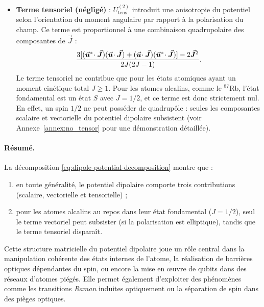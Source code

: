 \begin{itemize}[label = $\bullet$]
  \item[$\times$] \textbf{Terme tensoriel (négligé)} : $U_{\mathrm{tens}}^{(2)}$ introduit une anisotropie du potentiel selon l’orientation du moment angulaire par rapport à la polarisation du champ. Ce terme est proportionnel à une combinaison quadrupolaire des composantes de $\vec{J}$ :
\begin{eqnarray}
	\frac{3[(\vec{{\bm{u}}}^*\!\cdot \vec{{\bm{J}}})(\vec{{\bm{u}}}\!\cdot\vec{{\bm{J}}})+(\vec{{\bm{u}}}\!\cdot\vec{{\bm{J}}})(\vec{{\bm{u}}}^*\!\cdot \vec{{\bm{J}}})]-2\vec{{\bm{J}}}^2}{2J(2J-1)}.	
\end{eqnarray}
Le terme tensoriel ne contribue que pour les états atomiques ayant un moment cinétique total $J \geq 1$. Pour les atomes alcalins, comme le ${}^{87}\mathrm{Rb}$, l’état fondamental est un état $S$ avec $J = 1/2$, et ce terme est donc strictement nul. En effet, un spin $1/2$ ne peut posséder de quadrupôle : seules les composantes scalaire et vectorielle du potentiel dipolaire subsistent (voir Annexe~\ref{annex:no_tensor} pour une démonstration détaillée).




\end{itemize}

\paragraph{Résumé.}  
La décomposition \eqref{eq:dipole-potential-decomposition} montre que :
\begin{enumerate}[label=(\roman*)]
	\item en toute généralité, le potentiel dipolaire comporte trois contributions (scalaire, vectorielle et tensorielle) ;
	\item pour les atomes alcalins au repos dans leur état fondamental ($J=1/2$), seul le terme vectoriel peut subsister (si la polarisation est elliptique), tandis que le terme tensoriel disparaît.
\end{enumerate}

\medskip

Cette structure matricielle du potentiel dipolaire joue un rôle central dans la manipulation cohérente des états internes de l’atome, la réalisation de barrières optiques dépendantes du spin, ou encore la mise en œuvre de qubits dans des réseaux d’atomes piégés. Elle permet également d’exploiter des phénomènes comme les transitions \emph{Raman} induites optiquement ou la séparation de spin dans des pièges optiques.

